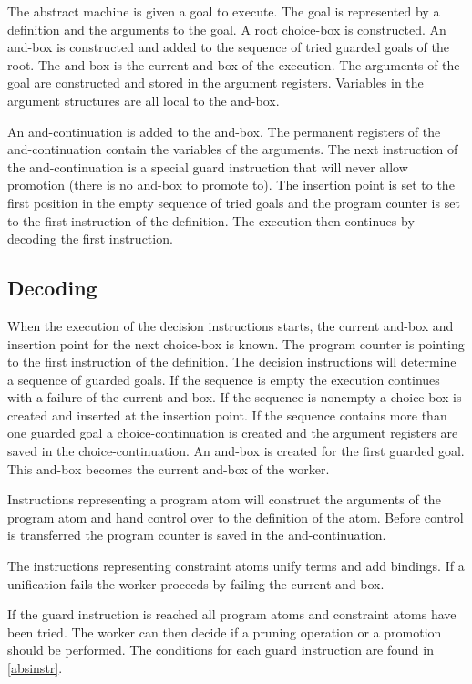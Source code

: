 The abstract machine is given a goal to execute. The goal is
represented by a definition and the arguments to the goal.
A root choice-box is constructed. An and-box is constructed
and added to the sequence of tried guarded goals of the root. The
and-box is the current and-box of the execution. The arguments of the
goal are constructed and stored in the argument registers.
Variables in the argument structures are all local to the and-box.

An and-continuation is added to the and-box. The permanent registers
of the and-continuation contain the variables of the arguments. The
next instruction of the and-continuation is a special guard
instruction that will never allow promotion (there is no and-box to
promote to). The insertion point is set to the first position
in the empty sequence of tried goals and the program counter is set to the
first instruction of the definition. The execution then continues by
decoding the first instruction.


\subsection*{Decoding}

When the execution of the decision instructions starts,
 the current
and-box and insertion point for the next choice-box is known.  The
program counter is pointing to the first instruction of the
definition. The decision instructions will determine a sequence of
guarded goals. If the sequence is empty the execution continues with a
failure of the current and-box.  If the sequence is nonempty a
choice-box is created and inserted at the insertion point. If the
sequence contains more than one guarded goal a choice-continuation is
created and the argument registers are saved in  the
choice-continuation. An and-box is created for the first guarded goal.
This and-box becomes the current and-box of the worker.

Instructions representing a program atom will construct the arguments
of the program atom and hand control over to the definition of the
atom.  Before control is transferred the program counter is saved in
the and-continuation. 

The instructions representing constraint atoms unify terms and
add bindings. If a unification fails the worker proceeds by failing
the current and-box.

If the guard instruction is reached all program atoms and constraint
atoms have been tried. The worker can then decide if a pruning operation
or a promotion should be performed. The conditions for each guard
instruction are found in \ref{absinstr}. 

